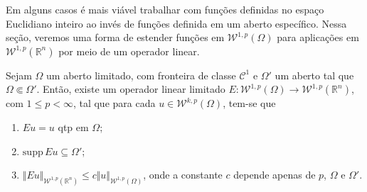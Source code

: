 \documentclass[a4paper, 11pt]{book}
\theoremstyle{definition}
\newcommand{\bR}{\mathbb{R}}
\newcommand{\cC}{\mathcal{C}}
\newcommand{\cW}{\mathcal{W}}
\newcommand{\supp}{\mathrm{supp}\,}
\begin{document}
Em alguns casos é mais viável trabalhar com funções definidas no espaço Euclidiano inteiro ao invés de funções definida em um aberto específico.
Nessa seção, veremos uma forma de estender funções em $\cW^{1,p}(\Omega)$ para aplicações em $\cW^{1,p}(\bR^n)$ por meio de um operador linear.

\begin{tbox} \label{thm:extensao}
        Sejam $\Omega$ um aberto limitado, com fronteira de classe $\cC^1$ e $\Omega'$ um aberto tal que $\Omega \Subset \Omega'$. Então, existe um operador linear limitado $E : \cW^{1,p}(\Omega) \to \cW^{1,p}(\bR ^n)$, com $1 \leqslant p < \infty$, tal que para cada $u \in \cW^{k,p}(\Omega)$, tem-se que
    \begin{enumerate}[leftmargin=*, label=\textbf{(\alph*)}]
        \item $Eu = u$ qtp em $\Omega$;
        \item $\supp Eu \subseteq \Omega'$;
        \item $\Vert Eu \Vert_{\cW^{1,p}(\bR^n)} \leqslant c \Vert u \Vert_{\cW^{1,p}(\Omega)}$, onde a constante $c$ depende apenas de $p$, $\Omega$ e $\Omega'$.
    \end{enumerate}
\end{tbox}
\end{document}
